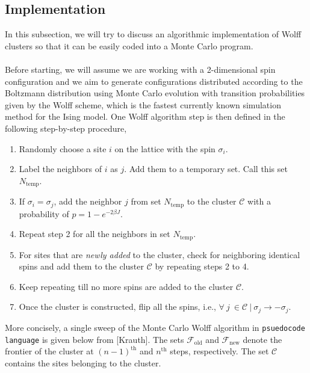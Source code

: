 \documentclass[../thesis_main.tex]{subfiles}
\begin{document}
\subsection{Implementation}
In this subsection, we will try to discuss an algorithmic implementation of Wolff clusters so that it can be easily coded into a Monte Carlo program.~\\~\\
Before starting, we will assume we are working with a 2-dimensional spin configuration and we aim to generate configurations distributed according to the Boltzmann distribution using Monte Carlo evolution with transition probabilities given by the Wolff scheme, which is the fastest currently known simulation method for the Ising model. One Wolff algorithm step is then defined in the following step-by-step procedure,
\begin{enumerate}
    \setlength\itemsep{0.3em}
    \item Randomly choose a site $i$ on the lattice with the spin $\sigma_i$.
    \item Label the neighbors of $i$ as $j$. Add them to a temporary set. Call this set $N_\text{temp}$. 
    \item If $\sigma_i = \sigma_j$, add the neighbor $j$ from set $N_\text{temp}$ to the cluster $\mathcal{C}$  with a probability of $p = 1 - e^{-2\beta J}$.
    \item Repeat step 2 for all the neighbors in set $N_\text{temp}$.
    \item For sites that are \textit{newly added} to the cluster, check for neighboring identical spins and add them to the cluster $\mathcal{C}$ by repeating steps 2 to 4.
    \item Keep repeating till no more spins are added to the cluster $\mathcal{C}$.
    \item Once the cluster is constructed, flip all the spins, i.e., $\forall \:j \: \in \mathcal{C} \: | \: \sigma_j \to - \sigma_j$.
\end{enumerate}
More concisely, a single sweep of the Monte Carlo Wolff algorithm in \texttt{psuedocode language} is given below from [Krauth]. The sets $\mathcal{F}_\text{old}$ and $\mathcal{F}_\text{new}$ denote the frontier of the cluster at $(n-1)^\text{th}$ and $n^\text{th}$ steps, respectively. The set $\mathcal{C}$ contains the sites belonging to the cluster.~\\~\\
\end{document}
